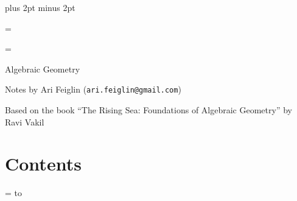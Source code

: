 


\parindent=0pt
\parskip=3pt plus 2pt minus 2pt

\footline={}


\headline={\pagedecor}

{\setboxshadow
\contentbox

    \centerline{Algebraic Geometry}
    \smallskip
    \centerline{Notes by Ari Feiglin ({\tt ari.feiglin@gmail.com})}
    \centerline{Based on the book {\rm``The Rising Sea: Foundations of Algebraic Geometry''} by Ravi Vakil}

\eppbox

\bigskip

\contentbox
    \section*{Contents}
    
    \tableofcontents
\eppbox

}

\vfill\break

\color{black}

\newif\ifpageodd
\pageoddtrue
\headline={%
    \hbox to \hsize{\color{black}%
        \ifpageodd\hfil{\it\currsubsection\quad\bf\folio}\global\pageoddfalse%
        \else{\bf\folio\quad\it\currsubsection}\hfil\global\pageoddtrue\fi%
    }%
}





\bye

